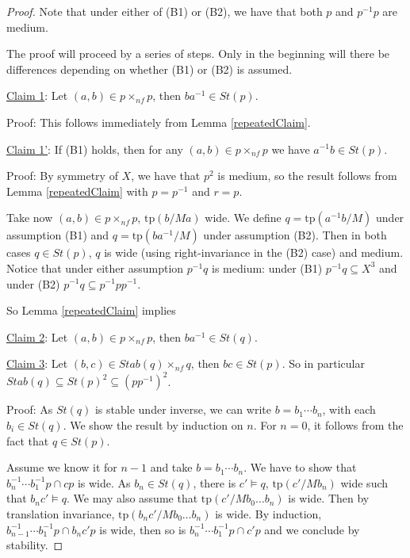 \documentclass[12pt]{article}
\theoremstyle{definition}
\theoremstyle{mystyle}
\theoremstyle{remark}
\newcommand{\tp}{\mathrm{tp}}
\newcommand{\nf}{\times_{nf}}
\begin{document}
\begin{proof}
Note that under either of (B1) or (B2), we have that both $p$ and $p^{-1}p$ are medium.

The proof will proceed by a series of steps. Only in the beginning will there be differences depending on whether (B1) or (B2) is assumed.

\smallskip \noindent
\underline{Claim 1}: Let $(a,b)\in p \nf p$, then $ba^{-1}\in St(p)$.

\noindent
Proof: This follows immediately from Lemma \ref{repeatedClaim}.


\smallskip \noindent
\underline{Claim 1'}: If (B1) holds, then for any $(a,b)\in p \nf p$ we have $a^{-1}b\in St(p)$.

\noindent
Proof: By symmetry of $X$, we have that $p^2$ is medium, so the result follows from Lemma \ref{repeatedClaim} with $p=p^{-1}$ and $r=p$.

\medskip

Take now $(a,b)\in p\nf p$, $\tp(b/Ma)$ wide. We define $q=\tp(a^{-1}b/M)$ under assumption (B1) and $q=\tp(ba^{-1}/M)$ under assumption (B2). Then in both cases $q\in St(p)$, $q$ is wide (using right-invariance in the (B2) case) and medium. Notice that under either assumption $p^{-1}q$ is medium: under (B1) $p^{-1}q\subseteq X^3$ and under (B2) $p^{-1}q \subseteq p^{-1}pp^{-1}$.

So Lemma \ref{repeatedClaim} implies

\smallskip \noindent
\underline{Claim 2}: Let $(a,b)\in p \nf p$, then $ba^{-1}\in St(q)$.



\smallskip \noindent
\underline{Claim 3}: Let $(b,c)\in Stab(q)\nf q$, then $bc\in
St(p)$. So in particular $Stab(q)\subseteq St(p)^2 \subseteq
(pp^{-1})^2$.

\noindent
Proof: As $St(q)$ is stable under inverse, we can write $b=b_1\cdots b_n$, with each $b_i \in St(q)$. We show the result by induction on $n$. For $n=0$, it follows from the fact that $q\in St(p)$.

Assume we know it for $n-1$ and take $b=b_1\cdots b_n$. We have to show that $b_n^{-1}\cdots b_1^{-1} p \cap cp$ is wide. As $b_n \in St(q)$, there is $c'\models q$, $\tp(c'/Mb_n)$ wide such that $b_n c' \models q$. We may also assume that $\tp(c'/Mb_0\ldots b_n)$ is wide. Then by translation invariance, $\tp(b_nc'/Mb_0\ldots b_n)$ is wide. By induction, $b_{n-1}^{-1}\cdots b_1^{-1} p \cap b_nc' p$ is wide, then so is $b_n^{-1}\cdots b_1^{-1}p \cap c'p$ and we conclude by stability.


\end{proof}
\end{document}
